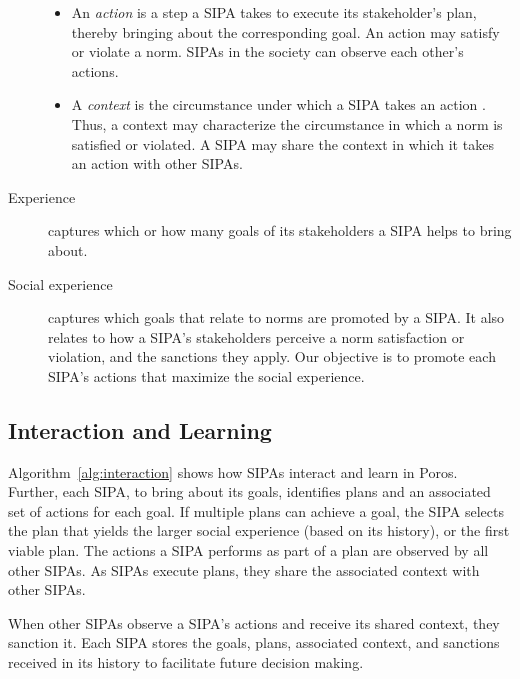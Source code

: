 \documentclass[11pt,          %
               phd,           %
               onehalfspacing %
               ]{ncsuthesis}
\newcommand{\frameworkB}{Poros\xspace}
\newcommand{\nsa}[1]{\textcolor{green!50!black}{NSA:~~#1}}
\newcommand{\mps}[1]{\textcolor{blue}{MPS:~~#1}}
\begin{document}
\begin{description}
\begin{itemize}[nosep]
  \item An \emph{action} is a step a SIPA takes to execute its
    stakeholder's plan, thereby bringing about the corresponding goal.
    An action may satisfy or violate a norm. SIPAs in the society can
    observe each other's actions. 
  \item A \emph{context} is the circumstance under which a SIPA takes
    an action \citep{Dey-2001-Context}. Thus, a context may characterize the circumstance in
    which a norm is satisfied or violated. A SIPA may share the
    context in which it takes an action with other SIPAs.
\end{itemize}

\item[Experience] captures which or how many goals of its stakeholders a SIPA helps to bring about. %

\item[Social experience] captures which goals that relate to norms are promoted by a SIPA. 
It also relates to how a SIPA's stakeholders perceive a
norm satisfaction or violation, and the sanctions they apply. Our
objective is to promote each SIPA's actions that maximize the
social experience. %
\end{description}

\subsection{Interaction and Learning}


Algorithm~\ref{alg:interaction} shows how SIPAs interact and learn in
\frameworkB. Further, each SIPA, to bring about its goals, identifies
plans and an associated set of actions for each goal. If multiple plans
can achieve a goal, the SIPA selects the plan that yields the larger
social experience (based on its history), or the first viable plan. The
actions a SIPA performs as part of a plan are observed by all other
SIPAs. As SIPAs execute plans, they share the associated context with
other SIPAs.

When other SIPAs observe a SIPA's actions and receive its shared
context, they sanction it. Each SIPA stores the goals, plans, associated
context, and sanctions received in its history to facilitate future
decision making.
\end{document}
